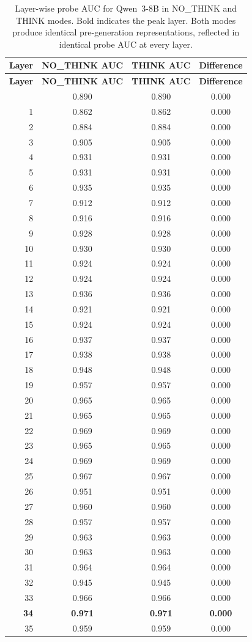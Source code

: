 \documentclass{article}
\begin{document}
\begin{longtable}{rccc}
\caption{Layer-wise probe AUC for Qwen~3-8B in NO\_THINK and THINK
  modes.  Bold indicates the peak layer.  Both modes produce identical
  pre-generation representations, reflected in identical probe AUC at
  every layer.}
\label{tab:qwen_probe_layers} \\
\toprule
\textbf{Layer} & \textbf{NO\_THINK AUC} & \textbf{THINK AUC} & \textbf{Difference} \\
\midrule
\endfirsthead
\toprule
\textbf{Layer} & \textbf{NO\_THINK AUC} & \textbf{THINK AUC} & \textbf{Difference} \\
\midrule
\endhead
\bottomrule
\endfoot
 0 & 0.890 & 0.890 & 0.000 \\
 1 & 0.862 & 0.862 & 0.000 \\
 2 & 0.884 & 0.884 & 0.000 \\
 3 & 0.905 & 0.905 & 0.000 \\
 4 & 0.931 & 0.931 & 0.000 \\
 5 & 0.931 & 0.931 & 0.000 \\
 6 & 0.935 & 0.935 & 0.000 \\
 7 & 0.912 & 0.912 & 0.000 \\
 8 & 0.916 & 0.916 & 0.000 \\
 9 & 0.928 & 0.928 & 0.000 \\
10 & 0.930 & 0.930 & 0.000 \\
11 & 0.924 & 0.924 & 0.000 \\
12 & 0.924 & 0.924 & 0.000 \\
13 & 0.936 & 0.936 & 0.000 \\
14 & 0.921 & 0.921 & 0.000 \\
15 & 0.924 & 0.924 & 0.000 \\
16 & 0.937 & 0.937 & 0.000 \\
17 & 0.938 & 0.938 & 0.000 \\
18 & 0.948 & 0.948 & 0.000 \\
19 & 0.957 & 0.957 & 0.000 \\
20 & 0.965 & 0.965 & 0.000 \\
21 & 0.965 & 0.965 & 0.000 \\
22 & 0.969 & 0.969 & 0.000 \\
23 & 0.965 & 0.965 & 0.000 \\
24 & 0.969 & 0.969 & 0.000 \\
25 & 0.967 & 0.967 & 0.000 \\
26 & 0.951 & 0.951 & 0.000 \\
27 & 0.960 & 0.960 & 0.000 \\
28 & 0.957 & 0.957 & 0.000 \\
29 & 0.963 & 0.963 & 0.000 \\
30 & 0.963 & 0.963 & 0.000 \\
31 & 0.964 & 0.964 & 0.000 \\
32 & 0.945 & 0.945 & 0.000 \\
33 & 0.966 & 0.966 & 0.000 \\
\textbf{34} & \textbf{0.971} & \textbf{0.971} & \textbf{0.000} \\
35 & 0.959 & 0.959 & 0.000 \\
\end{longtable}
\end{document}
